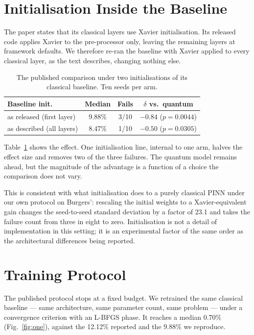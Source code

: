 \documentclass[conference,a4paper]{IEEEtran}
\begin{document}
\section{Initialisation Inside the Baseline}
\label{sec:init}

The paper states that its classical layers use Xavier initialisation. Its released code
applies Xavier to the pre-processor only, leaving the remaining layers at framework
defaults. We therefore re-ran the baseline with Xavier applied to every classical layer,
as the text describes, changing nothing else.

\begin{table}[t]
\caption{The published comparison under two initialisations of its classical baseline.
Ten seeds per arm.}
\label{tab:init}
\centering
\footnotesize
\begin{tabular}{lccc}
\toprule
Baseline init. & Median & Fails & $\delta$ vs.\ quantum \\
\midrule
as released (first layer) & 9.88\% & 3/10 & $-0.84$ ($p{=}0.0044$) \\
as described (all layers) & 8.47\% & 1/10 & $-0.50$ ($p{=}0.0305$) \\
\bottomrule
\end{tabular}
\end{table}

Table~\ref{tab:init} shows the effect. One initialisation line, internal to one arm,
halves the effect size and removes two of the three failures. The quantum model remains
ahead, but the magnitude of the advantage is a function of a choice the comparison does
not vary.

This is consistent with what initialisation does to a purely classical PINN under our own
protocol on Burgers': rescaling the initial weights to a Xavier-equivalent gain changes the
seed-to-seed standard deviation by a factor of 23.1 and takes the failure count from three
in eight to zero. Initialisation is not a detail of implementation in this setting; it is
an experimental factor of the same order as the architectural differences being reported.

\section{Training Protocol}
\label{sec:proto}

The published protocol stops at a fixed budget. We retrained the same classical baseline
--- same architecture, same parameter count, same problem --- under a convergence criterion
with an L-BFGS phase. It reaches a median 0.70\% (Fig.~\ref{fig:one}), against the 12.12\%
reported and the 9.88\% we reproduce.
\end{document}
